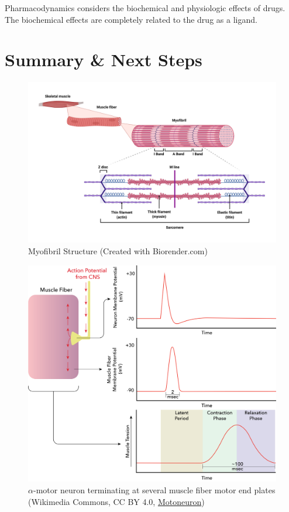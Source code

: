 Pharmacodynamics considers the biochemical and physiologic effects of drugs. The biochemical effects are completely related to the drug as a ligand. 

\section{Summary \& Next Steps}



\begin{figure}[!ht]
    \centering
    \includegraphics[width=1\linewidth]{./figure/Myofibril_Structure.png}
    \caption{Myofibril Structure \footnotesize{(Created with Biorender.com)}}
    \label{fig:Myofibril_Structure}
\end{figure}


\begin{figure}[!ht]
    \centering
    \includegraphics[width=1\linewidth]{./figure/eac-latency.png}
    \caption{$\alpha$-motor neuron terminating at several muscle fiber motor end plates \footnotesize{(Wikimedia Commons, CC BY 4.0, \href{https://commons.wikimedia.org/wiki/File:Motoneuron.png}{Motoneuron})}}
    \label{fig:Motoneuron}
\end{figure}

\printbibliography[heading=subbibintoc]



